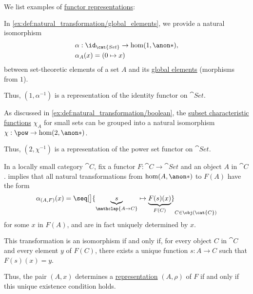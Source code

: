 \begin{example}\label{ex:def:functor_representation}
  We list examples of \hyperref[def:functor_representation]{functor representations}:
  \begin{thmenum}
     In \cref{ex:def:natural_transformation/global_elements}, we provide a natural isomorphism
    \begin{equation*}
      \begin{aligned}
        &\alpha: \id_{\cat{Set}} \to \hom(1, \anon*), \\
        &\alpha_A(x) = (0 \mapsto x)
      \end{aligned}
    \end{equation*}
    between set-theoretic elements of a set \( A \) and its \hyperref[def:global_element]{global elements} (morphisms from \( 1 \)).

    Thus, \( (1, \alpha^{-1}) \) is a representation of the identity functor on \( \cat{Set} \).

     As discussed in \cref{ex:def:natural_transformation/boolean}, the \hyperref[def:subset_characteristic_function]{subset characteristic functions} \( \chi_A \) for small sets can be grouped into a natural isomorphism \( \chi: \pow \to \hom(2, \anon*) \).

    Thus, \( (2, \chi^{-1}) \) is a representation of the power set functor on \( \cat{Set} \).
  \end{thmenum}
\end{example}

\begin{remark}\label{rem:yoneda_representation_characterization}
  In a locally small category \( \cat{C} \), fix a functor \( F: \cat{C} \to \cat{Set} \) and an object \( A \) in \( \cat{C} \).  implies that all natural transformations from \( \hom(A, \anon*) \) to \( F(A) \) have the form
  \begin{equation*}
    \alpha_{(A, F)}(x) = \seq[\big]{ \underbrace{s}_{\mathclap{A \to C}} \mapsto \underbrace{F(s)(x)}_{F(C)} }_{C \in \obj(\cat{C})}
  \end{equation*}
  for some \( x \) in \( F(A) \), and are in fact uniquely determined by \( x \).

  This transformation is an isomorphism if and only if, for every object \( C \) in \( \cat{C} \) and every element \( y \) of \( F(C) \), there exists a unique function \( s: A \to C \) such that \( F(s)(x) = y \).

  Thus, the pair \( (A, x) \) determines a \hyperref[def:functor_representation]{representation} \( (A, \rho) \) of \( F \) if and only if this unique existence condition holds.
\end{remark}
